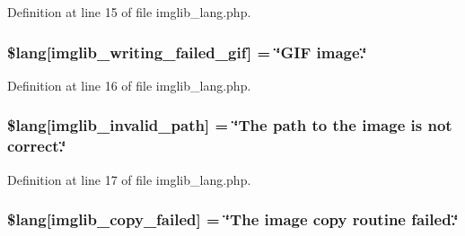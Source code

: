 Definition at line 15 of file imglib\+\_\+lang.\+php.

\subsubsection[{\texorpdfstring{\$lang}{$lang}}]{\setlength{\rightskip}{0pt plus 5cm}\$lang\mbox{[}\textquotesingle{}imglib\+\_\+writing\+\_\+failed\+\_\+gif\textquotesingle{}\mbox{]} = \char`\"{}G\+IF image.\char`\"{}}\hypertarget{system_2language_2english_2imglib__lang_8php_a6169e9ed18d970dcc8965c4f195ae3e7}{}\label{system_2language_2english_2imglib__lang_8php_a6169e9ed18d970dcc8965c4f195ae3e7}


Definition at line 16 of file imglib\+\_\+lang.\+php.

\subsubsection[{\texorpdfstring{\$lang}{$lang}}]{\setlength{\rightskip}{0pt plus 5cm}\$lang\mbox{[}\textquotesingle{}imglib\+\_\+invalid\+\_\+path\textquotesingle{}\mbox{]} = \char`\"{}The path to the image is not correct.\char`\"{}}\hypertarget{system_2language_2english_2imglib__lang_8php_a8ff486c25806a4731d1ffe20431df825}{}\label{system_2language_2english_2imglib__lang_8php_a8ff486c25806a4731d1ffe20431df825}


Definition at line 17 of file imglib\+\_\+lang.\+php.

\subsubsection[{\texorpdfstring{\$lang}{$lang}}]{\setlength{\rightskip}{0pt plus 5cm}\$lang\mbox{[}\textquotesingle{}imglib\+\_\+copy\+\_\+failed\textquotesingle{}\mbox{]} = \char`\"{}The image copy routine failed.\char`\"{}}\hypertarget{system_2language_2english_2imglib__lang_8php_a9363000d2005b8276b39d581a11b562d}{}\label{system_2language_2english_2imglib__lang_8php_a9363000d2005b8276b39d581a11b562d}


